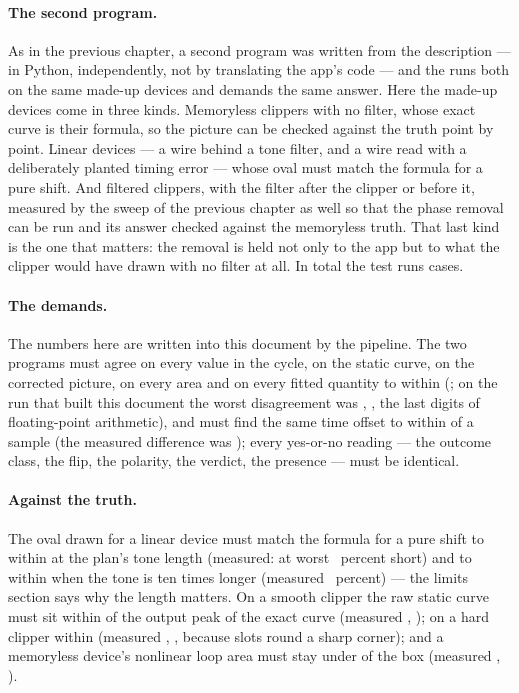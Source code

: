 \documentclass[11pt,a4paper]{article}
\begin{document}
\paragraph{The second program.} As in the previous chapter, a second program was written from the
description --- in Python, independently, not by translating the app's
code --- and the  runs both on the same made-up devices
and demands the same answer. Here the made-up devices come in three
kinds. Memoryless clippers with no filter, whose exact curve is their
formula, so the picture can be checked against the truth point by point.
Linear devices --- a wire behind a tone filter, and a wire read with a
deliberately planted timing error --- whose oval must match the formula
for a pure shift. And filtered clippers, with the filter after the clipper
or before it, measured by the sweep of the previous chapter as well so
that the phase removal can be run and its answer checked against the
memoryless truth. That last kind is the one that matters: the removal is
held not only to the app but to what the clipper would have drawn with no
filter at all. In total the test runs \tparityCaseCount{} cases.

\paragraph{The demands.} The numbers here are written into this document
by the pipeline. The two programs must agree on every value in the cycle, on the static curve, on
the corrected picture, on every area and on every fitted quantity to
within \tparitySwiftWords{} (\tparitySwift; on the run that built this
document the worst disagreement was \tparityWorstSwiftWords,
\tparityWorstSwift, the last digits of floating-point arithmetic), and
must find the same time offset to within \tparitySwiftShiftWords{} of a
sample (the measured difference was \tparityWorstShift); every yes-or-no reading --- the
outcome class, the flip, the polarity, the verdict, the presence --- must
be identical.

\paragraph{Against the truth.} The oval drawn for a linear device must match the formula
for a pure shift to within \tparityEllipseRatioWords{} at the plan's tone
length (measured: at worst \tparityEllipseDeficitShort~percent short) and
to within \tparityEllipseRatioLongWords{} when the tone is ten times
longer (measured \tparityEllipseDeficitLong~percent) --- the limits
section says why the length matters. On a smooth clipper the raw static
curve must sit within \tparityRawStaticSmoothWords{} of the output peak of
the exact curve (measured \tparityTanhStaticWords, \tparityTanhStatic); on
a hard clipper within \tparityRawStaticHardclipWords{} (measured
\tparityHardclipStaticWords, \tparityHardclipStatic, because
\tcBins{} slots round a sharp corner); and a memoryless device's nonlinear
loop area must stay under \tparityMemorylessNonlinearWords{} of the box
(measured \tparityWorstMemorylessNonlinearWords,
\tparityWorstMemorylessNonlinear).
\end{document}
